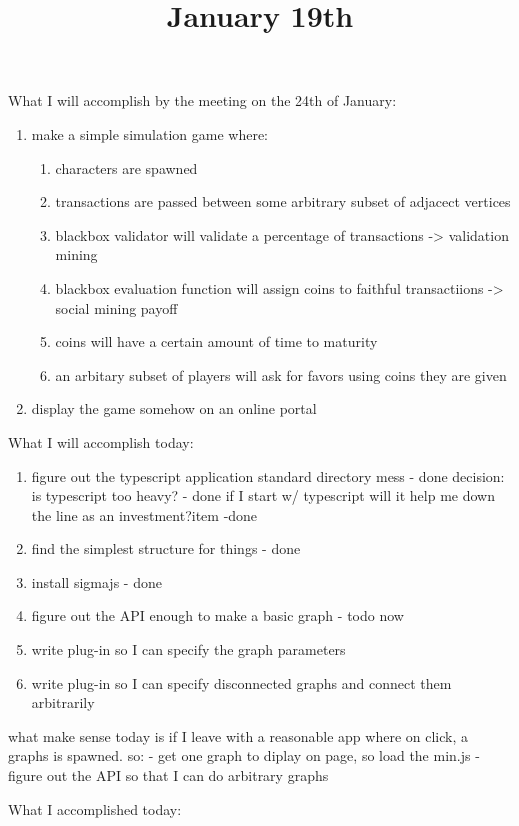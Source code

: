 \title{January 19th}


What I will accomplish by the meeting on the 24th of January:

\begin{enumerate}
	\item make a simple simulation game where:
		\begin{enumerate}
			\item characters are spawned
			\item transactions are passed between some arbitrary subset of adjacect vertices
			\item blackbox validator will validate a percentage of transactions  -> validation mining
			\item blackbox evaluation function will assign coins to faithful transactiions -> social mining payoff
			\item coins will have a certain amount of time to maturity
			\item an arbitary subset of players will ask for favors using coins they are given
		\end{enumerate}
	\item display the game somehow on an online portal
\end{enumerate}

What I will accomplish today:

\begin{enumerate}
	\item figure out the typescript application standard directory mess - done
		decision: is typescript too heavy? - done
		if I start w/ typescript will it help me down the line as an investment?item -done
	\item find the simplest structure for things - done
	\item install sigmajs  - done
	\item figure out the API enough to make a basic graph - todo now
	\item write plug-in so I can specify the graph parameters
	\item write plug-in so I can specify disconnected graphs and connect them arbitrarily
\end{enumerate}

what make sense today is if I leave with a reasonable app where on click,
a graphs is spawned. so:
	- get one graph to diplay on page, so load the min.js
	- figure out the API so that I can do arbitrary graphs
	


What I accomplished today:

